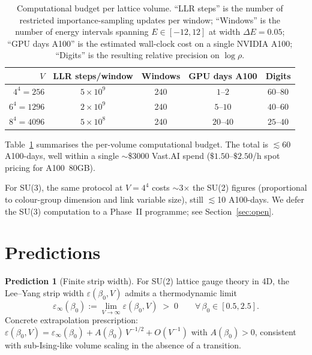 \documentclass[11pt,a4paper]{article}
\theoremstyle{definition}
\newtheorem{prediction}[theorem]{Prediction}
\theoremstyle{remark}
\begin{document}
\begin{table}[t]
\centering
\caption{Computational budget per lattice volume.
``LLR steps'' is the number of restricted importance-sampling
updates per window; ``Windows'' is the number of energy intervals
spanning $E \in [-12, 12]$ at width $\Delta E = 0.05$; ``GPU days
A100'' is the estimated wall-clock cost on a single NVIDIA A100;
``Digits'' is the resulting relative precision on $\log\rho$.}
\label{tab:budget}
\begin{tabular}{rcccc}
\toprule
$V$ & LLR steps/window & Windows & GPU days A100 & Digits \\
\midrule
$4^4 = 256$    & $5 \times 10^9$  & 240 & $1$--$2$   & $60$--$80$ \\
$6^4 = 1296$   & $2 \times 10^9$  & 240 & $5$--$10$  & $40$--$60$ \\
$8^4 = 4096$   & $5 \times 10^8$  & 240 & $20$--$40$ & $25$--$40$ \\
\bottomrule
\end{tabular}
\end{table}

Table~\ref{tab:budget} summarises the per-volume computational
budget. The total is $\lesssim 60$ A100-days, well within a single
$\sim$\$3000 Vast.AI spend ($\$1.50$--$\$2.50$/h spot pricing for
A100~80GB).

For SU(3), the same protocol at $V = 4^4$ costs $\sim$3$\times$ the
SU(2) figures (proportional to colour-group dimension and link
variable size), still $\lesssim$10 A100-days. We defer the SU(3)
computation to a Phase~II programme; see Section~\ref{sec:open}.

\medskip

\section{Predictions}\label{sec:predictions}

\begin{prediction}[Finite strip width]\label{pred:P1}
For SU(2) lattice gauge theory in 4D, the Lee--Yang strip width
$\varepsilon(\beta_0, V)$ admits a thermodynamic limit
\begin{equation}
\varepsilon_\infty(\beta_0) := \lim_{V \to \infty}
\varepsilon(\beta_0, V) \;>\;0
\qquad \forall\,\beta_0 \in [0.5, 2.5].
\label{eq:P1}
\end{equation}
Concrete extrapolation prescription:
$\varepsilon(\beta_0, V) = \varepsilon_\infty(\beta_0)
+ A(\beta_0)\,V^{-1/2} + O(V^{-1})$
with $A(\beta_0) > 0$, consistent with sub-Ising-like volume
scaling in the absence of a transition.
\end{prediction}
\end{document}
